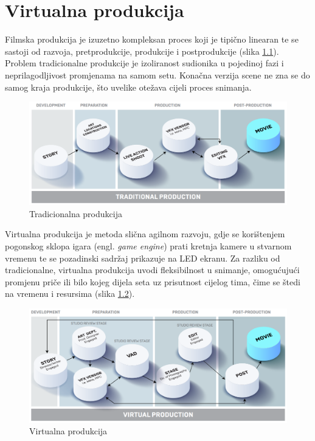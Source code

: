 \documentclass[times, utf8, zavrsni, numeric]{fer}
\begin{document}
\chapter{Virtualna produkcija}
Filmska produkcija je izuzetno kompleksan proces koji je tipično linearan te se sastoji od razvoja, pretprodukcije, produkcije i postprodukcije (slika \ref{fig:slika 2-1}). Problem tradicionalne produkcije je izoliranost sudionika u pojedinoj fazi i neprilagodljivost promjenama na samom setu. Konačna verzija scene ne zna se do samog kraja produkcije, što uvelike otežava cijeli proces snimanja. \newline

\begin{figure}[htp]
	\centering
	\includegraphics[width=\linewidth]{slika 2-1.png}
	\caption{Tradicionalna produkcija \cite{vpguide1}}
	\label{fig:slika 2-1}
\end{figure}

Virtualna produkcija je metoda slična agilnom razvoju, gdje se korištenjem pogonskog sklopa igara (engl. \emph{game engine}) prati kretnja kamere u stvarnom vremenu te se pozadinski sadržaj prikazuje na LED ekranu. Za razliku od tradicionalne, virtualna produkcija uvodi fleksibilnost u snimanje, omogućujući promjenu priče ili bilo kojeg dijela seta uz prisutnost cijelog tima, čime se štedi na vremenu i resursima (slika \ref{fig:slika 2-2}).

\begin{figure}[htp]
	\centering
	\includegraphics[width=\linewidth]{slika 2-2.png}
	\caption{Virtualna produkcija \cite{vpguide1}}
	\label{fig:slika 2-2}
\end{figure}
\end{document}
